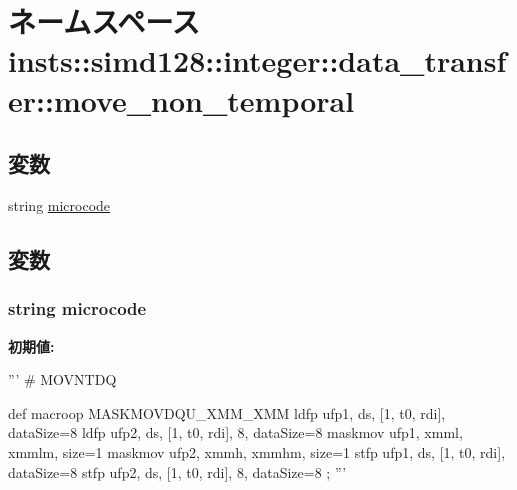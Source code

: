 \hypertarget{namespaceinsts_1_1simd128_1_1integer_1_1data__transfer_1_1move__non__temporal}{
\section{ネームスペース insts::simd128::integer::data\_\-transfer::move\_\-non\_\-temporal}
\label{namespaceinsts_1_1simd128_1_1integer_1_1data__transfer_1_1move__non__temporal}
}
\subsection*{変数}
\begin{DoxyCompactItemize}
\item 
string \hyperlink{namespaceinsts_1_1simd128_1_1integer_1_1data__transfer_1_1move__non__temporal_a770f11a173e99389a8802f0107ed8f52}{microcode}
\end{DoxyCompactItemize}


\subsection{変数}
\hypertarget{namespaceinsts_1_1simd128_1_1integer_1_1data__transfer_1_1move__non__temporal_a770f11a173e99389a8802f0107ed8f52}{
\subsubsection[{microcode}]{\setlength{\rightskip}{0pt plus 5cm}string {\bf microcode}}}
\label{namespaceinsts_1_1simd128_1_1integer_1_1data__transfer_1_1move__non__temporal_a770f11a173e99389a8802f0107ed8f52}
{\bfseries 初期値:}
\begin{DoxyCode}
'''
# MOVNTDQ

def macroop MASKMOVDQU_XMM_XMM {
    ldfp ufp1, ds, [1, t0, rdi], dataSize=8
    ldfp ufp2, ds, [1, t0, rdi], 8, dataSize=8
    maskmov ufp1, xmml, xmmlm, size=1
    maskmov ufp2, xmmh, xmmhm, size=1
    stfp ufp1, ds, [1, t0, rdi], dataSize=8
    stfp ufp2, ds, [1, t0, rdi], 8, dataSize=8
};
'''
\end{DoxyCode}
